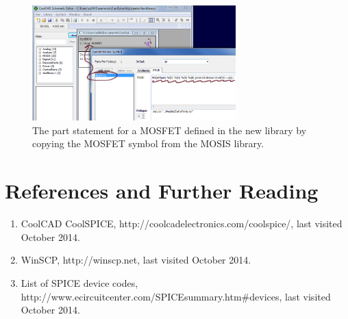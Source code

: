 \begin{figure}
	\includegraphics[width=0.7\textwidth]
	{./figures/getting_started_figures/SchematicEditor_MOSFETmodelexample.png}
  \caption{The part statement for a MOSFET defined in the new library by copying the MOSFET symbol from the MOSIS library.}
  \label{fig_schematiceditor_mosfetcopyexample}
\end{figure}

%
\section{References and Further Reading}

\begin{enumerate}

\item CoolCAD CoolSPICE, http://coolcadelectronics.com/coolspice/, last visited October 2014.

\item WinSCP, http://winscp.net, last visited October 2014.

\item List of SPICE device codes, http://www.ecircuitcenter.com/SPICEsummary.htm\#devices, last visited October 2014.


\end{enumerate}
